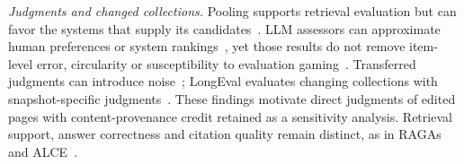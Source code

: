 \textit{Judgments and changed collections.}
Pooling supports retrieval evaluation but can favor the systems that supply its
candidates~\cite{poolbias2007}. LLM assessors can approximate human preferences
or system rankings~\cite{thomas2024,umbrela2025}, yet those results do not remove
item-level error, circularity or susceptibility to evaluation
gaming~\cite{faggioli2023,clarke2025}. Transferred judgments can introduce
noise~\cite{frobe2022,wowseval2025}; LongEval evaluates changing collections with
snapshot-specific judgments~\cite{longeval2023}. These findings motivate
direct judgments of edited pages with content-provenance credit retained as a
sensitivity analysis. Retrieval support, answer
correctness and citation quality remain distinct, as in RAGAs and ALCE~\cite{ragas2024,alce2023}.
